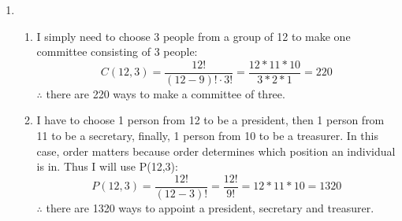 \documentclass[11pt]{article}
\begin{document}
\begin{enumerate}
					      		\item {
					      			      \begin{enumerate}
					      			      	\item{
					      			      	      I simply need to choose 3 people from a group of 12 to make one committee consisting of 3 people:
					      			      	      \begin{equation*}
					      			      	      	C(12, 3)
					      			      	      	=\frac{12!}{(12-9)!\cdot 3!}
					      			      	      	=\frac{12 * 11 * 10}{3 * 2 * 1}
					      			      	      	=220
					      			      	      \end{equation*}
					      			      	      $\therefore$ there are 220 ways to make a committee of three.
					      			      	}
					      			      	\item {
					      			      		      I have to choose 1 person from 12 to be a president, then 1 person from 11 to be a secretary, finally, 1 person from 10 to be a treasurer. In this case, order matters because order determines which position an individual is in. Thus I will use P(12,3):
					      			      		      \begin{equation*}
					      			      		      	P(12, 3)
					      			      		      	=\frac{12!}{(12-3)!}
					      			      		      	=\frac{12!}{9!}
					      			      		      	=12*11*10
					      			      		      	=1320
					      			      		      \end{equation*}
					      			      		      $\therefore$ there are 1320 ways to appoint a president, secretary and treasurer.
					      			      		}
					      			      	\end{enumerate}
					      			      }
					      			      

\end{enumerate}
\end{document}
